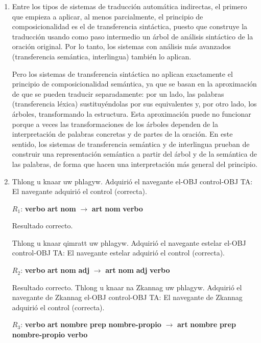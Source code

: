 \begin{enumerate}
\item Entre los tipos de sistemas de traducción automática indirectas, el primero que empieza a aplicar, al menos parcialmente, el principio de composicionalidad es el de transferencia sintáctica, puesto que construye la traducción usando como paso intermedio un árbol de análisis sintáctico de la oración original. Por lo tanto, los sistemas con análisis más avanzados (transferencia semántica, interlingua) también lo aplican. 

Pero los sistemas de transferencia sintáctica no aplican exactamente el principio de composicionalidad semántica, ya que se basan en la aproximación de que se pueden traducir separadamente: por un lado, las palabras (transferencia léxica) sustituyéndolas por sus equivalentes y, por otro lado, los árboles, transformando la estructura. Esta aproximación puede no funcionar porque a veces las transformaciones de los árboles dependen de la interpretación de palabras concretas y de partes de la oración. En este sentido, los sistemas de transferencia semántica y de interlingua prueban de construir una representación semántica a partir del árbol y de la semántica de las palabras, de forma que hacen una interpretación más general del principio. 

\item

     \begin{example} 
     \gll Thlong u knaar uw phlagyw. 
          {Adquirió} el navegante el-OBJ control-OBJ 
     \glt TA: El navegante adquirió el control (correcta). 
     \glend
     \end{example} 
$R_1$: \textbf{verbo} \textbf{art} \textbf{nom} $\rightarrow$ \textbf{art} \textbf{nom} \textbf{verbo} 

Resultado correcto. 

     \begin{example} 
     \gll Thlong u knaar qimratt uw phlagyw. 
          {Adquirió} el navegante estelar el-OBJ control-OBJ 
     \glt TA: El navegante estelar adquirió el control (correcta). 
     \glend
     \end{example} 
$R_2$: \textbf{verbo} \textbf{art} \textbf{nom} \textbf{adj} $\rightarrow$ \textbf{art} \textbf{nom} \textbf{adj} \textbf{verbo} 
     \begin{example} 
     Resultado correcto. 
     \gll Thlong u knaar na Zkannag uw phlagyw. 
          {Adquirió} el navegante de Zkannag el-OBJ control-OBJ 
     \glt TA: El navegante de Zkannag adquirió el control (correcta). 
     \glend
     \end{example} 
$R_3$: \textbf{verbo} \textbf{art} \textbf{nombre} \textbf{prep} \textbf{nombre-propio} $\rightarrow$ \textbf{art} \textbf{nombre} \textbf{prep} \textbf{nombre-propio} \textbf{verbo} 


\end{enumerate}

